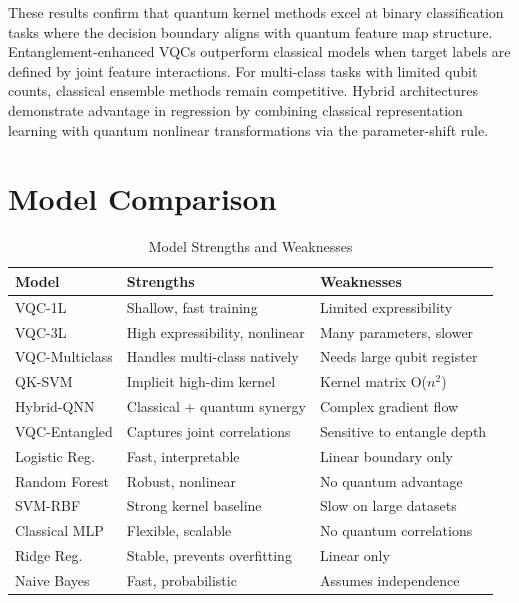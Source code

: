 \documentclass[conference]{IEEEtran}
\begin{document}
These results confirm that quantum kernel methods excel at binary classification tasks where the decision boundary aligns with quantum feature map structure. Entanglement-enhanced VQCs outperform classical models when target labels are defined by joint feature interactions. For multi-class tasks with limited qubit counts, classical ensemble methods remain competitive. Hybrid architectures demonstrate advantage in regression by combining classical representation learning with quantum nonlinear transformations via the parameter-shift rule.

\section{Model Comparison}

\begin{table}[htbp]
\caption{Model Strengths and Weaknesses}
\label{tab:models}
\renewcommand{\arraystretch}{1.2}
\begin{tabular}{p{1.7cm} p{2.8cm} p{2.8cm}}
\toprule
\textbf{Model} & \textbf{Strengths} & \textbf{Weaknesses} \\
\midrule
VQC-1L         & Shallow, fast training         & Limited expressibility \\
VQC-3L         & High expressibility, nonlinear & Many parameters, slower \\
VQC-Multiclass & Handles multi-class natively   & Needs large qubit register \\
QK-SVM         & Implicit high-dim kernel       & Kernel matrix O($n^2$) \\
Hybrid-QNN     & Classical + quantum synergy    & Complex gradient flow \\
VQC-Entangled  & Captures joint correlations    & Sensitive to entangle depth \\
Logistic Reg.  & Fast, interpretable            & Linear boundary only \\
Random Forest  & Robust, nonlinear              & No quantum advantage \\
SVM-RBF        & Strong kernel baseline         & Slow on large datasets \\
Classical MLP  & Flexible, scalable             & No quantum correlations \\
Ridge Reg.     & Stable, prevents overfitting   & Linear only \\
Naive Bayes    & Fast, probabilistic            & Assumes independence \\
\bottomrule
\end{tabular}
\end{table}
\end{document}
